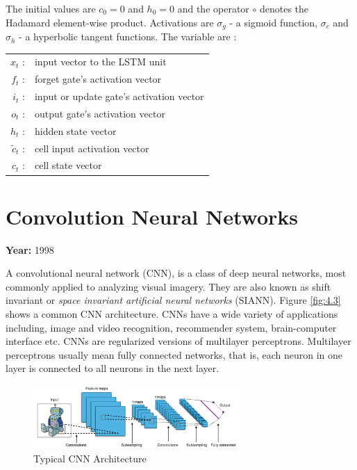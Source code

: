 \documentclass[12pt, a4paper]{report}
\begin{document}
The initial values are $c_0 = 0$ and $h_0 = 0$ and the operator $\circ$ denotes the Hadamard element-wise product. Activations are $\sigma_g$ - a sigmoid function, $\sigma_c$ and $\sigma_h$  - a hyperbolic tangent functions. The variable are \cite{wiki:lstm}:

\begin{table}[h]
    \centering
    \begin{tabular}{ r l }
        $x_t$           : & input vector to the LSTM unit            \\
        $f_t$           : & forget gate's activation vector          \\
        $i_{t}$         : & input or update gate's activation vector \\
        $o_{t}$         : & output gate's activation vector          \\
        $h_{t}$         : & hidden state vector                      \\
        $\tilde{c}_{t}$ : & cell input activation vector             \\
        $c_{t}$         : & cell state vector
    \end{tabular}
\end{table}

\section{Convolution Neural Networks}
\label{sec:cnnlr}

\textbf{Year:} 1998

A convolutional neural network (CNN), is a class of deep neural networks, most commonly applied to analyzing visual imagery. They are also known as shift invariant or \emph{space invariant artificial neural networks} (SIANN). Figure \eqref{fig:4.3} shows a common CNN architecture. CNNs have a wide variety of applications including, image and video recognition, recommender system, brain-computer interface etc. CNNs are regularized versions of multilayer perceptrons. Multilayer perceptrons usually mean fully connected networks, that is, each neuron in one layer is connected to all neurons in the next layer.

\begin{figure}[!htbp]
    \centering
    \includegraphics[width=0.7\textwidth]{Typical_cnn.png}
    \caption[Typical CNN Architecture]{Typical CNN Architecture \cite{wiki:cnns}}
    \label{fig:4.3}
\end{figure}
\end{document}

